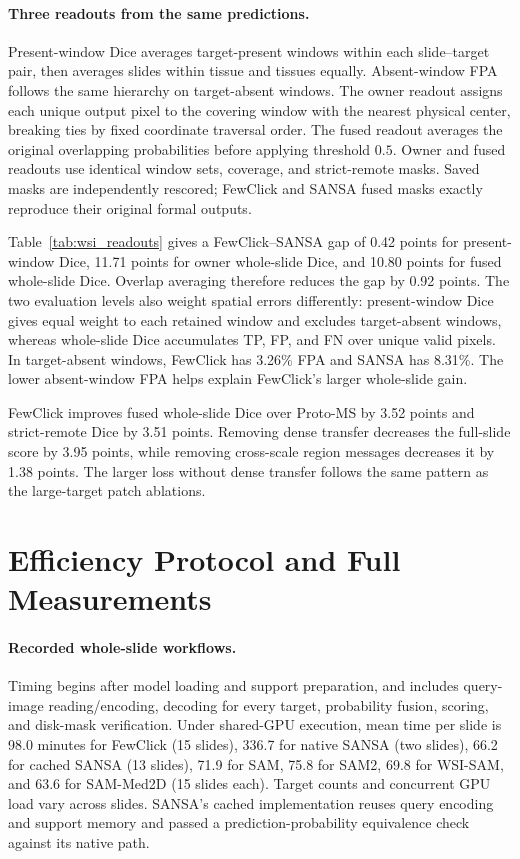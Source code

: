 \paragraph{Three readouts from the same predictions.}
Present-window Dice averages target-present windows within each slide--target pair, then averages slides within tissue and tissues equally. Absent-window FPA follows the same hierarchy on target-absent windows. The owner readout assigns each unique output pixel to the covering window with the nearest physical center, breaking ties by fixed coordinate traversal order. The fused readout averages the original overlapping probabilities before applying threshold $0.5$. Owner and fused readouts use identical window sets, coverage, and strict-remote masks. Saved masks are independently rescored; FewClick and SANSA fused masks exactly reproduce their original formal outputs.

Table~\ref{tab:wsi_readouts} gives a FewClick--SANSA gap of 0.42 points for present-window Dice, 11.71 points for owner whole-slide Dice, and 10.80 points for fused whole-slide Dice. Overlap averaging therefore reduces the gap by 0.92 points. The two evaluation levels also weight spatial errors differently: present-window Dice gives equal weight to each retained window and excludes target-absent windows, whereas whole-slide Dice accumulates TP, FP, and FN over unique valid pixels. In target-absent windows, FewClick has 3.26\% FPA and SANSA has 8.31\%. The lower absent-window FPA helps explain FewClick's larger whole-slide gain.

FewClick improves fused whole-slide Dice over Proto-MS by 3.52 points and strict-remote Dice by 3.51 points. Removing dense transfer decreases the full-slide score by 3.95 points, while removing cross-scale region messages decreases it by 1.38 points. The larger loss without dense transfer follows the same pattern as the large-target patch ablations.

\section{Efficiency Protocol and Full Measurements}

\paragraph{Recorded whole-slide workflows.}
Timing begins after model loading and support preparation, and includes query-image reading/encoding, decoding for every target, probability fusion, scoring, and disk-mask verification. Under shared-GPU execution, mean time per slide is 98.0 minutes for FewClick (15 slides), 336.7 for native SANSA (two slides), 66.2 for cached SANSA (13 slides), 71.9 for SAM, 75.8 for SAM2, 69.8 for WSI-SAM, and 63.6 for SAM-Med2D (15 slides each). Target counts and concurrent GPU load vary across slides. SANSA's cached implementation reuses query encoding and support memory and passed a prediction-probability equivalence check against its native path.

